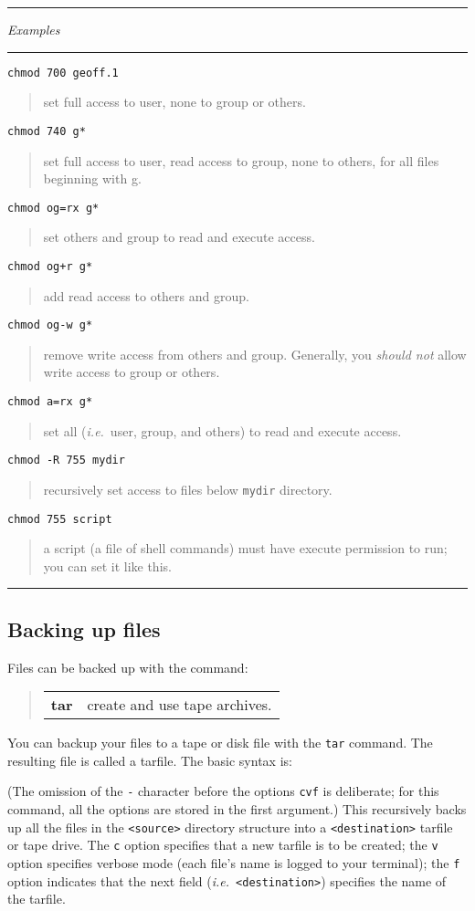 \documentclass[twoside,11pt,nolof]{starlink}
\providecommand{\example}[2]{\goodbreak
                         \texttt{#1}
                         \vspace*{-4mm}
                         \begin{quote}
                           {\small #2}
                         \end{quote}
                        }
\providecommand{\exbegin}{\begin{center}
                      \rule{18mm}{0.3mm}
                      \emph{Examples}
                      \rule{18mm}{0.3mm}
                      \end{center}
                     }
\providecommand{\exend}{\begin{center}
                    \rule{50mm}{0.3mm}
                    \end{center}
                   }
\begin{document}
\goodbreak

\exbegin

\example{chmod 700 geoff.1}
{set full access to user, none to group or others.}

\example{chmod 740 g*}
{set full access to user, read access to group, none to others, for all files
beginning with g.}

\example{chmod og=rx g*}
{set others and group to read and execute access.}

\example{chmod og+r g*}
{add read access to others and group.}

\example{chmod og-w g*}
{remove write access from others and group. Generally, you \emph{should not\/}
allow write access to group or others.}

\example{chmod a=rx g*}
{set all (\emph{i.e.}\ user, group, and others) to read and execute access.}

\example{chmod -R 755 mydir}
{recursively set access to files below \texttt{mydir} directory.}

\example{chmod 755 script}
{a script (a file of shell commands) must have execute permission to run; you
can set it like this.}

\exend

\subsection{Backing up files}

Files can be backed up with the command:
\begin{quote}
\begin{tabular}{lp{72mm}}

\textbf{tar}  & create and use tape archives.

\end{tabular}
\end{quote}
You can backup your files to a tape or disk file with the \texttt{tar} command.
The resulting file is called a tarfile.
The basic syntax is:
\begin{terminalv}
\end{terminalv}
(The omission of the \texttt{-} character before the options \texttt{cvf} is
deliberate; for this command, all the options are stored in the first argument.)
This recursively backs up all the files in the \texttt{<source>} directory
structure into a \texttt{<destination>} tarfile or tape drive.
The \texttt{c} option specifies that a new tarfile is to be created;
the \texttt{v} option specifies verbose mode (each file's name is logged to your
terminal);
the \texttt{f} option indicates that the next field
(\emph{i.e.}\ \texttt{<destination>}) specifies the name of the tarfile.
\end{document}
